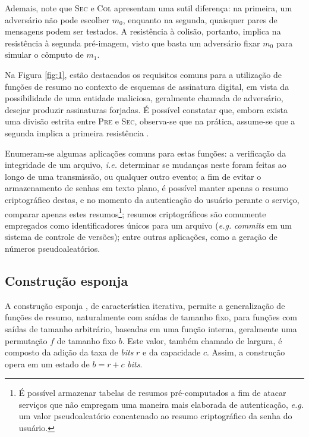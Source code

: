 \documentclass[12pt,notitlepage]{report}
\begin{document}
Ademais, note que \textsc{Sec} e \textsc{Col} apresentam uma sutil diferença:
na primeira, um adversário não pode escolher $m_0$, enquanto na segunda,
quaisquer pares de mensagens podem ser testados. A resistência à colisão,
portanto, implica na resistência à segunda pré-imagem, visto que basta um
adversário fixar $m_0$ para simular o cômputo de $m_1$.

Na Figura \ref{fig:1}, estão destacados os requisitos comuns para a utilização
de funções de resumo no contexto de esquemas de assinatura digital, em vista da
possibilidade de uma entidade maliciosa, geralmente chamada de adversário,
desejar produzir assinaturas forjadas. É possível constatar que, embora exista
uma divisão estrita entre \textsc{Pre} e \textsc{Sec}, observa-se que na
prática, assume-se que a segunda implica a primeira resistência
\cite[9.20]{Menezes:1996:HAC:548089}.

Enumeram-se algumas aplicações comuns para estas funções: a verificação da
integridade de um arquivo, \emph{i.e.} determinar se mudanças neste foram feitas ao
longo de uma transmissão, ou qualquer outro evento; a fim de evitar o
armazenamento de senhas em texto plano, é possível manter apenas o resumo
criptográfico destas, e no momento da autenticação do usuário perante o
serviço, comparar apenas estes resumos\footnote{É possível armazenar tabelas de
resumos pré-computados a fim de atacar serviços que não empregam uma maneira
mais elaborada de autenticação, \emph{e.g.} um valor pseudoaleatório concatenado ao
resumo criptográfico da senha do usuário.}; resumos criptográficos são
comumente empregados como identificadores únicos para um arquivo (\emph{e.g.}
\emph{commits} em um sistema de controle de versões); entre outras aplicações,
como a geração de números pseudoaleatórios.

\subsection{Construção esponja}
\label{subsection:sponge}

A construção esponja \cite{SpongeReference}, de característica iterativa,
permite a generalização de funções de resumo, naturalmente com saídas de
tamanho fixo, para funções com saídas de tamanho arbitrário, baseadas em uma
função interna, geralmente uma permutação $f$ de tamanho fixo $b$. Este valor,
também chamado de largura, é composto da adição da taxa de \emph{bits} $r$ e da
capacidade $c$. Assim, a construção opera em um estado de $b = r + c$
\emph{bits}.
\end{document}
